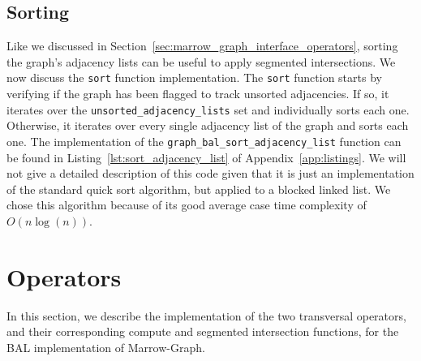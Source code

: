 \subsection{Sorting}
\label{sec:marrow_graph_sorting}

Like we discussed in Section~\ref{sec:marrow_graph_interface_operators}, sorting the graph's adjacency lists can be useful to apply segmented intersections. We now discuss the \texttt{sort} function implementation. The \texttt{sort} function starts by verifying if the graph has been flagged to track unsorted adjacencies. If so, it iterates over the \texttt{unsorted\_adjacency\_lists} set and individually sorts each one. Otherwise, it iterates over every single adjacency list of the graph and sorts each one. The implementation of the \texttt{graph\_bal\_sort\_adjacency\_list} function can be found in Listing~\ref{lst:sort_adjacency_list} of Appendix~\ref{app:listings}. We will not give a detailed description of this code given that it is just an implementation of the standard quick sort algorithm, but applied to a blocked linked list. We chose this algorithm because of its good average case time complexity of $O(n \log(n))$.


% 

\section{Operators}
\label{sec:marrow_graph_operators}

In this section, we describe the implementation of the two transversal operators, and their corresponding compute and segmented intersection functions, for the \gls{BAL} implementation of Marrow-Graph.

